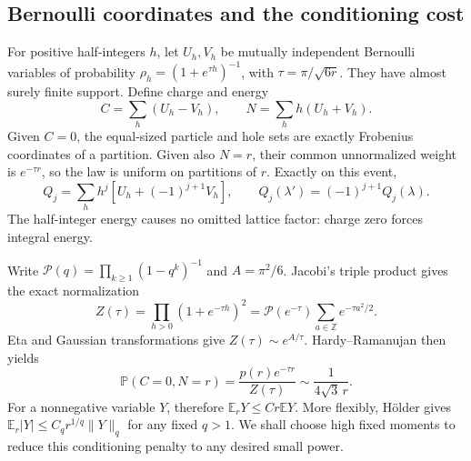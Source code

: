 \documentclass[11pt]{article}
\theoremstyle{remark}\newtheorem{remark}[theorem]{Remark}
\newcommand{\E}{\mathbb E}
\newcommand{\Prob}{\mathbb P}
\newcommand{\Z}{\mathbb Z}
\newcommand{\cP}{\mathcal P}
\begin{document}
\subsection{Bernoulli coordinates and the conditioning cost}
For positive half-integers $h$, let $U_h,V_h$ be mutually independent Bernoulli variables of probability $\rho_h=(1+e^{\tau h})^{-1}$, with $\tau=\pi/\sqrt{6r}$. They have almost surely finite support. Define charge and energy
\[
 C=\sum_h(U_h-V_h),\qquad N=\sum_h h(U_h+V_h).
\]
Given $C=0$, the equal-sized particle and hole sets are exactly Frobenius coordinates of a partition. Given also $N=r$, their common unnormalized weight is $e^{-\tau r}$, so the law is uniform on partitions of $r$. Exactly on this event,
\begin{equation}\label{stp:sum:eq:frobQ}
 Q_j=\sum_hh^j[U_h+(-1)^{j+1}V_h],\qquad
 Q_j(\lambda')=(-1)^{j+1}Q_j(\lambda).
\end{equation}
The half-integer energy causes no omitted lattice factor: charge zero forces integral energy.

Write $\cP(q)=\prod_{k\ge1}(1-q^k)^{-1}$ and $A=\pi^2/6$. Jacobi's triple product gives the exact normalization
\begin{equation}\label{stp:sum:eq:Jacobi}
 Z(\tau)=\prod_{h>0}(1+e^{-\tau h})^2
 =\cP(e^{-\tau})\sum_{a\in\Z}e^{-\tau a^2/2}.
\end{equation}
Eta and Gaussian transformations give $Z(\tau)\sim e^{A/\tau}$. Hardy--Ramanujan then yields
\begin{equation}\label{stp:sum:eq:conditioning}
 \Prob(C=0,N=r)=\frac{p(r)e^{-\tau r}}{Z(\tau)}
 \sim\frac1{4\sqrt3\,r}.
\end{equation}
For a nonnegative variable $Y$, therefore $\E_rY\le Cr\E Y$. More flexibly, Hölder gives $\E_r|Y|\le C_q r^{1/q}\|Y\|_q$ for any fixed $q>1$. We shall choose high fixed moments to reduce this conditioning penalty to any desired small power.
\end{document}
